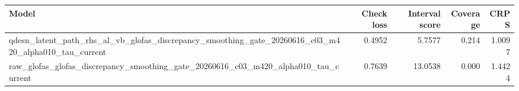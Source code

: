 \begin{tabular}{lrrrr}
\toprule
Model & Check loss & Interval score & Coverage & CRPS \\
\midrule
qdesn_latent_path_rhs_al_vb_glofas_discrepancy_smoothing_gate_20260616_c03_m420_alpha010_tau_current & 0.4952 & 5.7577 & 0.214 & 1.0097 \\
raw_glofas_glofas_discrepancy_smoothing_gate_20260616_c03_m420_alpha010_tau_current & 0.7639 & 13.0538 & 0.000 & 1.4424 \\
\bottomrule
\end{tabular}
